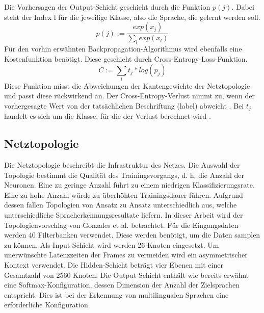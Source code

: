  Die Vorhersagen der Output-Schicht geschieht durch die Funktion $p(j)$. Dabei steht der Index l für die jeweilige Klasse, also die Sprache, die gelernt werden soll.  
\begin{equation*}
p(j) := \frac{ exp(x_{j}) }{\sum_{l}{}{ exp(x_{l})} }
\label{eq:soft}
\end{equation*}
Für den vorhin erwähnten Backpropagation-Algorithmus wird ebenfalls eine Kostenfunktion benötigt. Diese geschieht durch Cross-Entropy-Loss-Funktion.
\begin{equation*}
C:= \sum_{l}{}{ t_{j} * log(p_{j})} 
\label{eq:back}
\end{equation*}
Diese Funktion misst die Abweichungen der Kantengewichte der Netztopologie und passt diese rückwirkend an. Der Cross-Entropy-Verlust nimmt zu, wenn der vorhergesagte Wert von der tatsächlichen Beschriftung (label) abweicht \cite{MLCheatsheet.2017}. Bei $t_{j}$ handelt es sich um die Klasse, für die der Verlust berechnet wird \cite{GonzalezDominguez.2015}.

\subsection{Netztopologie}
Die Netztopologie beschreibt die Infrastruktur des Netzes. Die Auswahl der Topologie bestimmt die Qualität des Trainingsvorgangs, d. h. die Anzahl der Neuronen. Eine zu geringe Anzahl führt zu einem niedrigen Klassifizierungsrate. Eine zu hohe Anzahl würde zu überhöhten Trainingsdauer führen. Aufgrund dessen fallen Topologien von Ansatz zu Ansatz unterschiedlich aus, welche unterschiedliche Spracherkennungsresultate liefern. In dieser Arbeit wird der Topologienvorschlag von Gonzales et al. betrachtet. Für die Eingangsdaten werden 40 Filterbanken verwendet. Diese werden benötigt, um die Daten samplen zu können. Als Input-Schicht wird werden 26 Knoten eingesetzt. Um unerwünschte Latenzzeiten der Frames zu vermeiden wird ein asymmetrischer Kontext verwendet. Die Hidden-Schicht beträgt vier Ebenen mit einer Gesamtzahl von 2560 Knoten. Die Output-Schicht enthält wie bereits erwähnt eine Softmax-Konfiguration, dessen Dimension der Anzahl der Zielsprachen entspricht. Dies ist bei der Erkennung von multilingualen Sprachen eine erforderliche Konfiguration.
 
